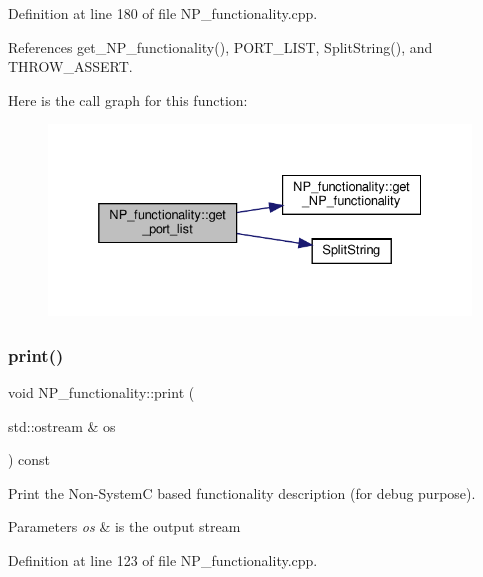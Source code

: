 Definition at line 180 of file N\+P\+\_\+functionality.\+cpp.



References get\+\_\+\+N\+P\+\_\+functionality(), P\+O\+R\+T\+\_\+\+L\+I\+ST, Split\+String(), and T\+H\+R\+O\+W\+\_\+\+A\+S\+S\+E\+RT.

Here is the call graph for this function\+:
\nopagebreak
\begin{figure}[H]
\begin{center}
\leavevmode
\includegraphics[width=332pt]{d8/dda/classNP__functionality_a10fa42ec58e4687fa2b31e965dae3f29_cgraph}
\end{center}
\end{figure}
\mbox{\label{classNP__functionality_a2e17b1f41fd29d5929aeb464ac87f233}} 
\subsubsection{\texorpdfstring{print()}{print()}}
{\footnotesize\ttfamily void N\+P\+\_\+functionality\+::print (\begin{DoxyParamCaption}\item[{std\+::ostream \&}]{os }\end{DoxyParamCaption}) const}



Print the Non-\/\+SystemC based functionality description (for debug purpose). 


\begin{DoxyParams}{Parameters}
{\em os} & is the output stream \\
\hline
\end{DoxyParams}


Definition at line 123 of file N\+P\+\_\+functionality.\+cpp.



